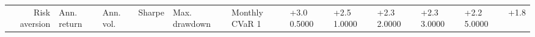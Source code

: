 \begin{tabular}{rlllllll}
\toprule
Risk aversion & Ann. return & Ann. vol. & Sharpe & Max. drawdown & Monthly CVaR 1%
 & +3.0%
0.5000 & +2.5%
1.0000 & +2.3%
2.0000 & +2.3%
3.0000 & +2.2%
5.0000 & +1.8%
\bottomrule
\end{tabular}
